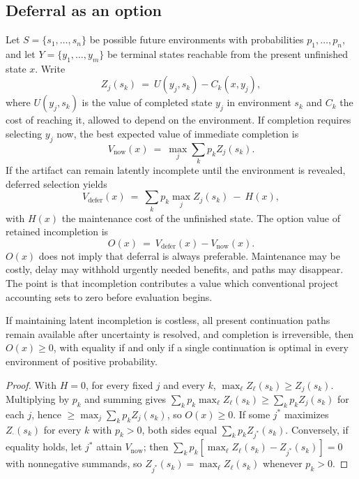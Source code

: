 \subsection{Deferral as an option}

Let $S=\{s_1,\dots,s_n\}$ be possible future environments with probabilities $p_1,\dots,p_n$, and let $Y=\{y_1,\dots,y_m\}$ be terminal states reachable from the present unfinished state $x$. Write
\begin{equation}
Z_j(s_k)\ =\ U(y_j,s_k)-C_k(x,y_j),
\end{equation}
where $U(y_j,s_k)$ is the value of completed state $y_j$ in environment $s_k$ and $C_k$ the cost of reaching it, allowed to depend on the environment. If completion requires selecting $y_j$ now, the best expected value of immediate completion is
\begin{equation}
V_{\mathrm{now}}(x)\ =\ \max_{j}\sum_{k}p_kZ_j(s_k).
\end{equation}
If the artifact can remain latently incomplete until the environment is revealed, deferred selection yields
\begin{equation}
V_{\mathrm{defer}}(x)\ =\ \sum_kp_k\max_jZ_j(s_k)\ -\ H(x),
\end{equation}
with $H(x)$ the maintenance cost of the unfinished state. The option value of retained incompletion is
\begin{equation}\label{eq:option}
O(x)\ =\ V_{\mathrm{defer}}(x)-V_{\mathrm{now}}(x).
\end{equation}
$O(x)$ does not imply that deferral is always preferable. Maintenance may be costly, delay may withhold urgently needed benefits, and paths may disappear. The point is that incompletion contributes a value which conventional project accounting sets to zero before evaluation begins.

\begin{proposition}\label{prop:option}
If maintaining latent incompletion is costless, all present continuation paths remain available after uncertainty is resolved, and completion is irreversible, then $O(x)\geq 0$, with equality if and only if a single continuation is optimal in every environment of positive probability.
\end{proposition}

\begin{proof}
With $H=0$, for every fixed $j$ and every $k$, $\max_\ell Z_\ell(s_k)\geq Z_j(s_k)$. Multiplying by $p_k$ and summing gives $\sum_kp_k\max_\ell Z_\ell(s_k)\geq\sum_kp_kZ_j(s_k)$ for each $j$, hence $\geq\max_j\sum_kp_kZ_j(s_k)$, so $O(x)\geq 0$. If some $j^\ast$ maximizes $Z_\cdot(s_k)$ for every $k$ with $p_k>0$, both sides equal $\sum_kp_kZ_{j^\ast}(s_k)$. Conversely, if equality holds, let $j^\ast$ attain $V_{\mathrm{now}}$; then $\sum_kp_k[\max_\ell Z_\ell(s_k)-Z_{j^\ast}(s_k)]=0$ with nonnegative summands, so $Z_{j^\ast}(s_k)=\max_\ell Z_\ell(s_k)$ whenever $p_k>0$.
\end{proof}

